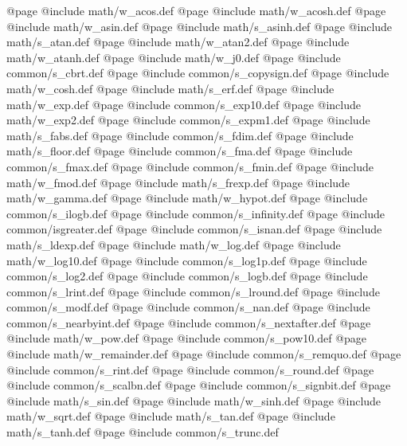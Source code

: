 @page
@include   math/w_acos.def
@page
@include   math/w_acosh.def
@page
@include   math/w_asin.def
@page 
@include   math/s_asinh.def
@page
@include   math/s_atan.def
@page 
@include   math/w_atan2.def
@page
@include   math/w_atanh.def
@page 
@include   math/w_j0.def
@page
@include common/s_cbrt.def
@page
@include common/s_copysign.def
@page
@include   math/w_cosh.def
@page
@include   math/s_erf.def
@page
@include   math/w_exp.def
@page
@include   common/s_exp10.def
@page
@include   math/w_exp2.def
@page
@include common/s_expm1.def
@page
@include   math/s_fabs.def
@page
@include common/s_fdim.def
@page
@include   math/s_floor.def
@page
@include common/s_fma.def
@page
@include common/s_fmax.def
@page
@include common/s_fmin.def
@page
@include   math/w_fmod.def
@page
@include   math/s_frexp.def
@page
@include   math/w_gamma.def
@page
@include   math/w_hypot.def
@page
@include common/s_ilogb.def
@page
@include common/s_infinity.def
@page
@include   common/isgreater.def
@page
@include common/s_isnan.def
@page
@include   math/s_ldexp.def
@page
@include   math/w_log.def
@page
@include   math/w_log10.def
@page
@include common/s_log1p.def
@page
@include common/s_log2.def
@page
@include common/s_logb.def
@page
@include common/s_lrint.def
@page
@include common/s_lround.def
@page
@include common/s_modf.def
@page
@include common/s_nan.def
@page
@include common/s_nearbyint.def
@page
@include common/s_nextafter.def
@page
@include   math/w_pow.def
@page
@include   common/s_pow10.def
@page
@include   math/w_remainder.def
@page
@include common/s_remquo.def
@page
@include common/s_rint.def
@page
@include common/s_round.def
@page
@include common/s_scalbn.def
@page
@include common/s_signbit.def
@page
@include   math/s_sin.def
@page
@include   math/w_sinh.def
@page
@include   math/w_sqrt.def
@page
@include   math/s_tan.def
@page
@include   math/s_tanh.def
@page
@include common/s_trunc.def
